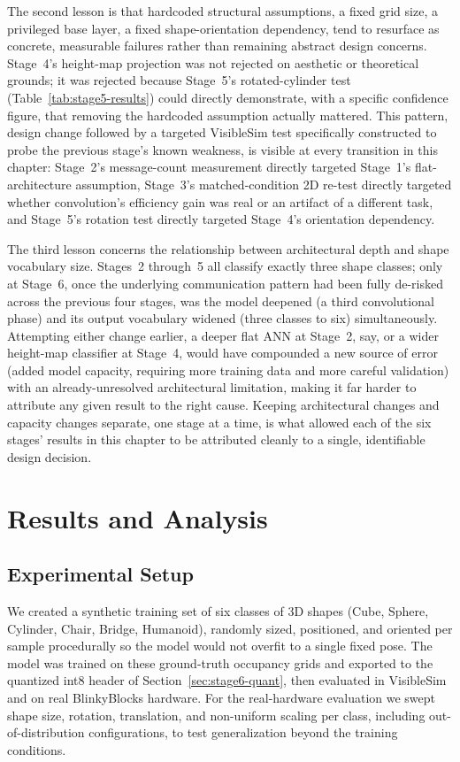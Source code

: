 \documentclass[12pt,a4paper]{report}
\begin{document}
The second lesson is that hardcoded structural assumptions, a fixed grid size, a privileged base layer, a fixed shape-orientation dependency, tend to resurface as concrete, measurable failures rather than remaining abstract design concerns. Stage~4's height-map projection was not rejected on aesthetic or theoretical grounds; it was rejected because Stage~5's rotated-cylinder test (Table~\ref{tab:stage5-results}) could directly demonstrate, with a specific confidence figure, that removing the hardcoded assumption actually mattered. This pattern, design change followed by a targeted VisibleSim test specifically constructed to probe the previous stage's known weakness, is visible at every transition in this chapter: Stage~2's message-count measurement directly targeted Stage~1's flat-architecture assumption, Stage~3's matched-condition 2D re-test directly targeted whether convolution's efficiency gain was real or an artifact of a different task, and Stage~5's rotation test directly targeted Stage~4's orientation dependency.

The third lesson concerns the relationship between architectural depth and shape vocabulary size. Stages~2 through~5 all classify exactly three shape classes; only at Stage~6, once the underlying communication pattern had been fully de-risked across the previous four stages, was the model deepened (a third convolutional phase) and its output vocabulary widened (three classes to six) simultaneously. Attempting either change earlier, a deeper flat ANN at Stage~2, say, or a wider height-map classifier at Stage~4, would have compounded a new source of error (added model capacity, requiring more training data and more careful validation) with an already-unresolved architectural limitation, making it far harder to attribute any given result to the right cause. Keeping architectural changes and capacity changes separate, one stage at a time, is what allowed each of the six stages' results in this chapter to be attributed cleanly to a single, identifiable design decision.

\chapter{Results and Analysis}
\label{ch:results}

\section{Experimental Setup}

We created a synthetic training set of six classes of 3D shapes (Cube, Sphere, Cylinder, Chair, Bridge, Humanoid), randomly sized, positioned, and oriented per sample procedurally so the model would not overfit to a single fixed pose. The model was trained on these ground-truth occupancy grids and exported to the quantized int8 header of Section~\ref{sec:stage6-quant}, then evaluated in VisibleSim~\cite{piranda2024ai4pm} and on real BlinkyBlocks hardware. For the real-hardware evaluation we swept shape size, rotation, translation, and non-uniform scaling per class, including out-of-distribution configurations, to test generalization beyond the training conditions.
\end{document}
